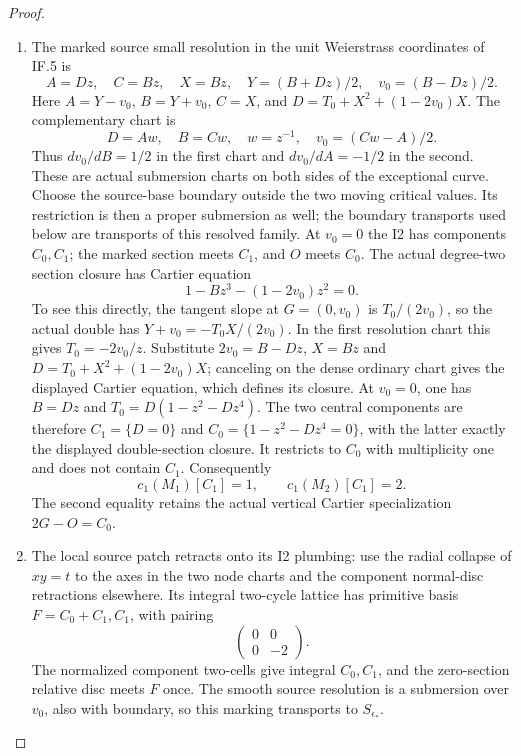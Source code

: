 \begin{proof}
\begin{enumerate}[label=\arabic*.]
\item The marked source small resolution in the unit
Weierstrass coordinates of IF.5 is
\[
 A=Dz,\quad C=Bz,\quad X=Bz,\quad
 Y=(B+Dz)/2,\quad v_0=(B-Dz)/2 .
\]
Here \(A=Y-v_0\), \(B=Y+v_0\), \(C=X\), and
\(D=T_0+X^2+(1-2v_0)X\). The complementary chart is
\[
 D=Aw,\quad B=Cw,\quad w=z^{-1},\quad
 v_0=(Cw-A)/2.
\]
Thus \(dv_0/dB=1/2\) in the first chart and
\(dv_0/dA=-1/2\) in the second. These are actual
submersion charts on both sides of the exceptional
curve. Choose the source-base boundary outside the
two moving critical values. Its restriction is then
a proper submersion as well; the boundary transports
used below are transports of this resolved family.
At \(v_0=0\) the I2 has components \(C_0,C_1\);
the marked section meets \(C_1\), and \(O\) meets
\(C_0\). The actual degree-two section closure has
Cartier equation
\[
                  1-Bz^3-(1-2v_0)z^2=0 .
\]
To see this directly, the tangent slope at
\(G=(0,v_0)\) is \(T_0/(2v_0)\), so the actual
double has \(Y+v_0=-T_0X/(2v_0)\). In the first
resolution chart this gives \(T_0=-2v_0/z\).
Substitute \(2v_0=B-Dz\), \(X=Bz\) and
\(D=T_0+X^2+(1-2v_0)X\); canceling on the dense
ordinary chart gives the displayed Cartier equation,
which defines its closure. At \(v_0=0\), one has
\(B=Dz\) and
\(T_0=D(1-z^2-Dz^4)\). The two central components
are therefore \(C_1=\{D=0\}\) and
\(C_0=\{1-z^2-Dz^4=0\}\), with the latter exactly
the displayed double-section closure.
It restricts to \(C_0\) with multiplicity one and
does not contain \(C_1\). Consequently
\[
 c_1(M_1)[C_1]=1,\qquad c_1(M_2)[C_1]=2.               \tag{P3K.57.IE.3}
\]
The second equality retains the actual vertical
Cartier specialization \(2G-O=C_0\).

\item The local source patch retracts onto its I2
plumbing: use the radial collapse of \(xy=t\)
to the axes in the two node charts and the
component normal-disc retractions elsewhere.
Its integral two-cycle lattice has primitive
basis \(F=C_0+C_1,C_1\), with pairing
\[
                  \begin{pmatrix}0&0\\0&-2\end{pmatrix}.       \tag{P3K.57.IE.4}
\]
The normalized component two-cells give integral
\(C_0,C_1\), and the zero-section relative disc
meets \(F\) once. The smooth source resolution
is a submersion over \(v_0\), also with boundary,
so this marking transports to \(S_{\epsilon_*}\).


\end{enumerate}
\end{proof}

